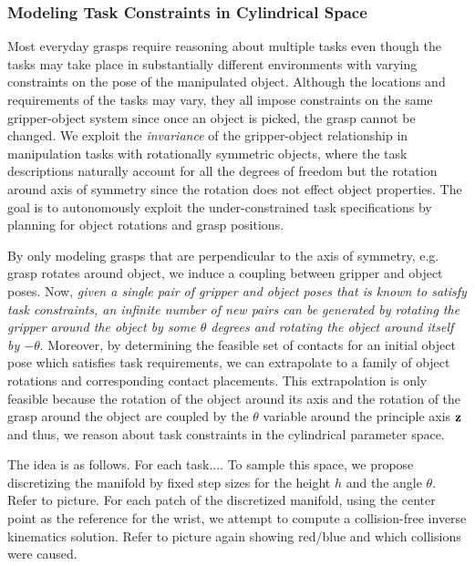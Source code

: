 \documentclass{aamas2015}
\begin{document}
\subsubsection{Modeling Task Constraints in Cylindrical Space}

Most everyday grasps require reasoning about multiple tasks even though the tasks may take place in
substantially different environments with varying constraints on the pose of the manipulated
object. Although the locations and requirements of the tasks may vary, they all impose constraints 
on the same gripper-object system since once an object is picked, the grasp cannot be changed. 
We exploit the \textit{invariance} of the gripper-object relationship in manipulation tasks with 
rotationally symmetric objects, where the task descriptions naturally account for all the degrees 
of freedom but the rotation around axis of symmetry since the rotation does not effect object
properties. The goal is to autonomously exploit the under-constrained task specifications by
planning for object rotations and grasp positions. 

By only modeling grasps that are perpendicular to the axis of symmetry, e.g. grasp
rotates around object, we induce a coupling between gripper and object poses. Now, \textit{given a
single pair of gripper and object poses that is known to satisfy task constraints, an infinite
number of new pairs can be generated by rotating the gripper around the object by some $\theta$ degrees and rotating the object
around itself by $-\theta$}. Moreover, by determining the feasible set of contacts for an initial object
pose which satisfies task requirements, we can extrapolate to a family of object rotations
and corresponding contact placements. This extrapolation is only feasible because the rotation
of the object around its axis and the rotation of the grasp around the object are coupled by 
the $\theta$ variable around the principle axis $\textbf{z}$ and thus, we reason about task
constraints in the cylindrical parameter space.

The idea is as follows. For each task.... 
To sample this space, we propose discretizing the manifold by fixed
step sizes for the height $h$ and the angle $\theta$. Refer to picture. For each patch of the
discretized manifold, using the center point  as the reference for the wrist, we attempt to compute
a collision-free inverse kinematics solution. Refer to picture again showing red/blue and which
collisions were caused. 
\end{document}
